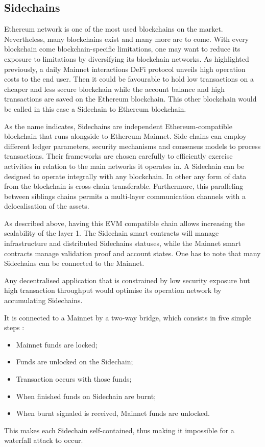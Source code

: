 \subsection{Sidechains}

Ethereum network is one of the most used blockchains on the market. Nevertheless, many blockchains exist and many more are to come. With every blockchain come blockchain-specific limitations, one may want to reduce its exposure to limitations by diversifying its blockchain networks. As highlighted previously, a daily Mainnet interactions DeFi protocol unveils high operation costs to the end user. Then it could be favourable to hold low transactions on a cheaper and less secure blockchain while the account balance and high transactions are saved on the Ethereum blockchain. This other blockchain would be called in this case a Sidechain to Ethereum blockchain.

As the name indicates, Sidechains are independent Ethereum-compatible blockchain that runs alongside to Ethereum Mainnet. Side chains can employ different ledger parameters, security mechanisms and consensus models to process transactions. Their frameworks are chosen carefully to efficiently exercise activities in relation to the main networks it operates in. A Sidechain can be designed to operate integrally with any blockchain. In other any form of data from the blockchain is cross-chain transferable. Furthermore, this paralleling between siblings chains permits a multi-layer communication channels with a delocalisation of the assets.

As described above, having this EVM compatible chain allows increasing the scalability of the layer 1. The Sidechain smart contracts will manage infrastructure and distributed Sidechains statuses, while the Mainnet smart contracts manage validation proof and account states. One has to note that many Sidechains can be connected to the Mainnet.

Any decentralised application that is constrained by low security exposure but high transaction throughput would optimise its operation network by accumulating Sidechains.

It is connected to a Mainnet by a two-way bridge, which consists in five simple steps :
\begin{itemize}
    \item Mainnet funds are locked;
    \item Funds are unlocked on the Sidechain;
    \item Transaction occurs with those funds;
    \item When finished funds on Sidechain are burnt;
    \item When burnt signaled is received, Mainnet funds are unlocked.
\end{itemize}
This makes each Sidechain self-contained, thus making it impossible for a waterfall attack to occur. 

